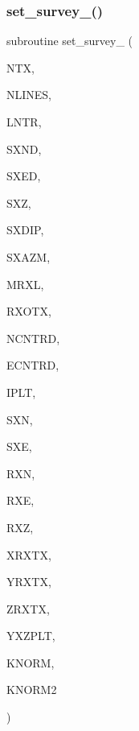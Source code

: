 \subsubsection{\texorpdfstring{set\+\_\+survey\+\_()}{set\_survey\_5()}}
{\footnotesize\ttfamily subroutine set\+\_\+survey\+\_ (\begin{DoxyParamCaption}\item[{integer}]{N\+TX,  }\item[{integer}]{N\+L\+I\+N\+ES,  }\item[{integer, dimension(4,nlines)}]{L\+N\+TR,  }\item[{real(kind=ql), dimension(1,ntx)}]{S\+X\+ND,  }\item[{real(kind=ql), dimension(1,ntx)}]{S\+X\+ED,  }\item[{real, dimension(ntx)}]{S\+XZ,  }\item[{real, dimension(ntx)}]{S\+X\+D\+IP,  }\item[{real, dimension(ntx)}]{S\+X\+A\+ZM,  }\item[{integer}]{M\+R\+XL,  }\item[{real, dimension(ntx)}]{R\+X\+O\+TX,  }\item[{real(kind=ql)}]{N\+C\+N\+T\+RD,  }\item[{real(kind=ql)}]{E\+C\+N\+T\+RD,  }\item[{integer, dimension(nlines)}]{I\+P\+LT,  }\item[{real, dimension(1,ntx)}]{S\+XN,  }\item[{real, dimension(1,ntx)}]{S\+XE,  }\item[{real, dimension (mrxl,nlines,1)}]{R\+XN,  }\item[{real, dimension (mrxl,nlines,1)}]{R\+XE,  }\item[{real, dimension (mrxl,nlines)}]{R\+XZ,  }\item[{real, dimension(1,ntx,1)}]{X\+R\+X\+TX,  }\item[{real, dimension(1,ntx,1)}]{Y\+R\+X\+TX,  }\item[{real, dimension(1,ntx)}]{Z\+R\+X\+TX,  }\item[{real(kind=ql), dimension(3,mrxl,nlines)}]{Y\+X\+Z\+P\+LT,  }\item[{integer, dimension(nlines)}]{K\+N\+O\+RM,  }\item[{integer, dimension(1,ntx)}]{K\+N\+O\+R\+M2 }\end{DoxyParamCaption})}


